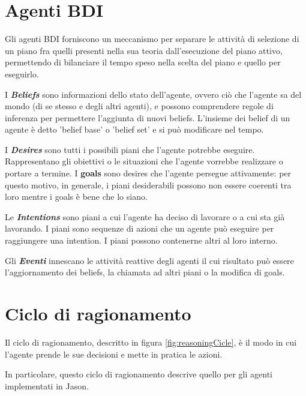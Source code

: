 \documentclass[12pt,a4paper,openright,twoside]{report}
\begin{document}
\section{Agenti BDI}
Gli agenti BDI forniscono un meccanismo per separare le attivit\`a di selezione di un piano fra quelli presenti nella sua teoria dall'esecuzione del piano attivo, permettendo di bilanciare il tempo speso nella scelta del piano e quello per eseguirlo.

I \textbf{\textit{Beliefs}} sono informazioni dello stato dell'agente, ovvero ci\`o che l'agente sa del mondo (di se stesso e degli altri agenti), e possono comprendere regole di inferenza per permettere l'aggiunta di nuovi beliefs. L'insieme dei belief di un agente \`e detto 'belief base' o 'belief set' e si pu\`o modificare nel tempo.

I \textbf{\textit{Desires}} sono tutti i possibili piani che l'agente potrebbe eseguire. Rappresentano gli obiettivi o le situazioni che l'agente vorrebbe realizzare o portare a termine. I \textbf{goals} sono desires che l'agente persegue attivamente: per questo motivo, in generale, i piani desiderabili possono non essere coerenti tra loro mentre i goals \`e bene che lo siano.

Le \textbf{\textit{Intentions}} sono piani a cui l'agente ha deciso di lavorare o a cui sta gi\`a lavorando. I piani sono sequenze di azioni che un agente pu\`o eseguire per raggiungere una intention. I piani possono contenerne altri al loro interno.

Gli \textbf{\textit{Eventi}} innescano le attivit\`a reattive degli agenti il cui risultato pu\`o essere l'aggiornamento dei beliefs, la chiamata ad altri piani o la modifica di goals.


\section{Ciclo di ragionamento}
Il ciclo di ragionamento, descritto in figura \ref{fig:reasoningCicle}, \`e il modo in cui l'agente prende le sue decisioni e mette in pratica le azioni.

In particolare, questo ciclo di ragionamento descrive quello per gli agenti implementati in Jason.
\end{document}
